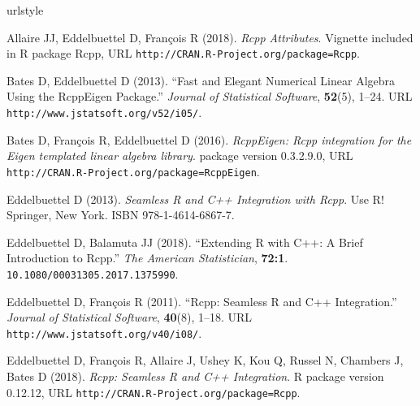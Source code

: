 \begin{thebibliography}{12}
\newcommand{\enquote}[1]{``#1''}
\providecommand{\natexlab}[1]{#1}
\providecommand{\url}[1]{\texttt{#1}}
\providecommand{\urlprefix}{URL }
\expandafter\ifx\csname urlstyle\endcsname\relax
  \providecommand{\doi}[1]{doi:\discretionary{}{}{}#1}\else
  \providecommand{\doi}{doi:\discretionary{}{}{}\begingroup
  \urlstyle{rm}\Url}\fi
\providecommand{\eprint}[2][]{\url{#2}}

Allaire JJ, Eddelbuettel D, Fran\c{c}ois R (2018).
\newblock \emph{{Rcpp} Attributes}.
\newblock Vignette included in R package Rcpp,
  \urlprefix\url{http://CRAN.R-Project.org/package=Rcpp}.

Bates D, Eddelbuettel D (2013).
\newblock \enquote{Fast and Elegant Numerical Linear Algebra Using the
  {RcppEigen} Package.}
\newblock \emph{Journal of Statistical Software}, \textbf{52}(5), 1--24.
\newblock \urlprefix\url{http://www.jstatsoft.org/v52/i05/}.

Bates D, Fran\c{c}ois R, Eddelbuettel D (2016).
\newblock \emph{RcppEigen: Rcpp integration for the Eigen templated linear
  algebra library}.
 package version 0.3.2.9.0,
  \urlprefix\url{http://CRAN.R-Project.org/package=RcppEigen}.

Eddelbuettel D (2013).
\newblock \emph{Seamless R and C++ Integration with Rcpp}.
\newblock Use R! Springer, New York.
\newblock ISBN 978-1-4614-6867-7.

Eddelbuettel D, Balamuta JJ (2018).
\newblock \enquote{Extending R with C++: A Brief Introduction to Rcpp.}
\newblock \emph{The American Statistician}, \textbf{72:1}.
\newblock \url{10.1080/00031305.2017.1375990}.

Eddelbuettel D, Fran\c{c}ois R (2011).
\newblock \enquote{{Rcpp}: Seamless {R} and {C++} Integration.}
\newblock \emph{Journal of Statistical Software}, \textbf{40}(8), 1--18.
\newblock \urlprefix\url{http://www.jstatsoft.org/v40/i08/}.

Eddelbuettel D, Fran\c{c}ois R, Allaire J, Ushey K, Kou Q, Russel N, Chambers
  J, Bates D (2018).
\newblock \emph{{Rcpp}: Seamless {R} and {C++} Integration}.
\newblock R package version 0.12.12,
  \urlprefix\url{http://CRAN.R-Project.org/package=Rcpp}.


\end{thebibliography}
